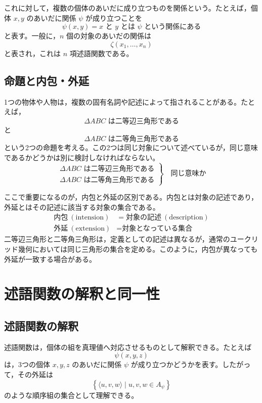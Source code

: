 \documentclass[../main.tex]{subfiles}
\begin{document}
これに対して，複数の個体のあいだに成り立つものを関係という。たとえば，個体 \(x,y\) のあいだに関係 \(\psi\) が成り立つことを
\[
  \psi(x,y)
  =
  x \text{ と } y \text{ とは } \psi \text{ という関係にある}
\]
と表す。一般に，\(n\) 個の対象のあいだの関係は
\[
  \zeta(x_1,\ldots,x_n)
\]
と表され，これは \(n\) 項述語関数である。

\subsection{命題と内包・外延}

1つの物体や人物は，複数の固有名詞や記述によって指されることがある。たとえば，
\[
  \Delta ABC \text{ は二等辺三角形である}
\]
と
\[
  \Delta ABC \text{ は二等角三角形である}
\]
という2つの命題を考える。この2つは同じ対象について述べているが，同じ意味であるかどうかは別に検討しなければならない。
\[
  \left.
  \begin{array}{l}
    \Delta ABC \text{ は二等辺三角形である} \\
    \Delta ABC \text{ は二等角三角形である}
  \end{array}
  \right\}
  \quad
  \text{同じ意味か}
\]

ここで重要になるのが，内包と外延の区別である。内包とは対象の記述であり，外延とはその記述に該当する対象の集合である。
\[
  \begin{array}{rl}
    \text{内包} \ (\mathrm{intension})
      &= \text{対象の記述} \ (\mathrm{description}) \\[2mm]
    \text{外延} \ (\mathrm{extension})
      &= \text{対象となっている集合}
  \end{array}
\]
二等辺三角形と二等角三角形は，定義としての記述は異なるが，通常のユークリッド幾何においては同じ三角形の集合を定める。このように，内包が異なっても外延が一致する場合がある。

\section{述語関数の解釈と同一性}

\subsection{述語関数の解釈}

述語関数は，個体の組を真理値へ対応させるものとして解釈できる。たとえば
\[
  \psi(x,y,z)
\]
は，3つの個体 \(x,y,z\) のあいだに関係 \(\psi\) が成り立つかどうかを表す。したがって，その外延は
\[
  \left\{
    \langle u,v,w \rangle
    \mid
    u,v,w \in A_{\psi}
  \right\}
\]
のような順序組の集合として理解できる。
\end{document}

